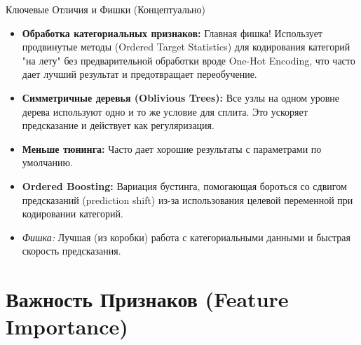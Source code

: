 \begin{alerttextbox}{Ключевые Отличия и Фишки (Концептуально)}
\begin{itemize}
            \begin{itemize}
                \item \textbf{Обработка категориальных признаков:} Главная фишка! Использует продвинутые методы (Ordered Target Statistics) для кодирования категорий "на лету" без предварительной обработки вроде One-Hot Encoding, что часто дает лучший результат и предотвращает переобучение.
                \item \textbf{Симметричные деревья (Oblivious Trees):} Все узлы на одном уровне дерева используют одно и то же условие для сплита. Это ускоряет предсказание и действует как регуляризация.
                \item \textbf{Меньше тюнинга:} Часто дает хорошие результаты с параметрами по умолчанию.
                \item \textbf{Ordered Boosting:} Вариация бустинга, помогающая бороться со сдвигом предсказаний (prediction shift) из-за использования целевой переменной при кодировании категорий.
                \item \textit{Фишка:} Лучшая (из коробки) работа с категориальными данными и быстрая скорость предсказания. %
            \end{itemize}
    \end{itemize}
\end{alerttextbox}

\section{Важность Признаков (Feature Importance)}


